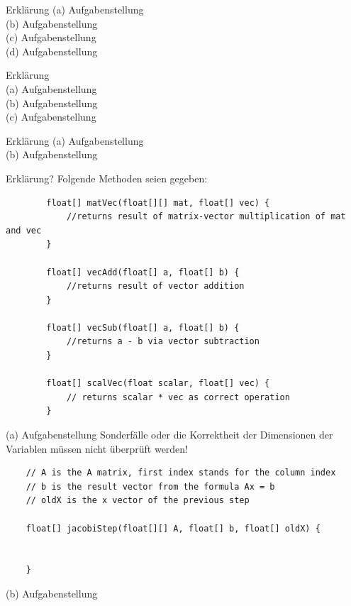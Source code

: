 \documentclass{scrartcl}
\begin{document}

	Erklärung
	\n
	(a)
	Aufgabenstellung
	\lbreak \lbreak \lbreak
	\\
	(b)
	Aufgabenstellung
	\lbreak \lbreak \lbreak
	\\
	(c)
	Aufgabenstellung
	\lbreak \lbreak \lbreak
	\\
	(d)
	Aufgabenstellung

	
	
	Erklärung
	\lbreak \\
	(a)
	Aufgabenstellung
	\lbreak \lbreak \lbreak \lbreak
	\\
	(b)
	Aufgabenstellung
	\lbreak \lbreak \lbreak \lbreak
	\\
	(c)
	Aufgabenstellung


	
	Erklärung
	(a)
	Aufgabenstellung
	\lbreak \lbreak \lbreak \lbreak
	\\
	(b)
	Aufgabenstellung
	


	Erklärung? \n 
	Folgende Methoden seien gegeben:
	\begin{lstlisting}
		float[] matVec(float[][] mat, float[] vec) {
			//returns result of matrix-vector multiplication of mat and vec
		}
		
		float[] vecAdd(float[] a, float[] b) {
			//returns result of vector addition
		}
		
		float[] vecSub(float[] a, float[] b) {
			//returns a - b via vector subtraction
		}
		
		float[] scalVec(float scalar, float[] vec) {
			// returns scalar * vec as correct operation
		}
	\end{lstlisting}
	\newpage
	(a) Aufgabenstellung
	\n 
	Sonderfälle oder die Korrektheit der Dimensionen der Variablen müssen nicht überprüft werden! \n 
	\begin{lstlisting}
	// A is the A matrix, first index stands for the column index
	// b is the result vector from the formula Ax = b
	// oldX is the x vector of the previous step
	
	float[] jacobiStep(float[][] A, float[] b, float[] oldX) {
		
		
	}
	\end{lstlisting}
	\lbreak
	(b) Aufgabenstellung
\end{document}
